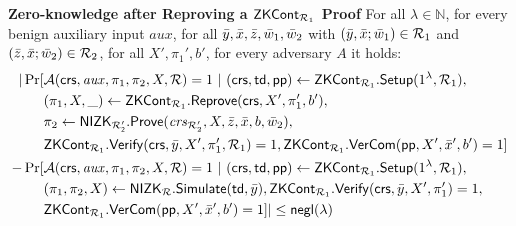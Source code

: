 \noindent \textbf{Zero-knowledge after Reproving a ${\mathsf{ZKCont}}_{\mathcal{R}_1}$ Proof} For all $\lambda \in \mathbb{N}$, for every benign auxiliary input $aux$, 
for all $\bar{y},\bar{x},\bar{z}, \bar{w}_1, \bar{w}_2$ with $(\bar{y}, \bar{x}; \bar{w}_1) \in \mathcal{R}_1$ and $(\bar{z}, \bar{x}; \bar{w}_2) \in \mathcal{R}_2$, for all $X',\pi_1', b'$, for every adversary $A$ it holds:
{\begin{align*}
		| \Pr[& \mathcal{A}(\mathsf{crs}, \mathit{aux}, \pi_1,\pi_2, X, \mathcal{R}) = 1 \ | \ (\mathsf{crs}, \mathsf{td}, \mathsf{pp}) \leftarrow {\ensuremath{\mathsf{ZKCont}}}_{\mathcal{R}_1}.{\mathsf{Setup}} (1^{\lambda}, \mathcal{R}_1), \\
		& (\pi_1, X, \_) \leftarrow {\ensuremath{\mathsf{ZKCont}}}_{\mathcal{R}_1}.{\mathsf{Reprove}} (\mathsf{crs}, X', \pi_1', b'), \\
		&\pi_2 \leftarrow {\ensuremath{\mathsf{NIZK_{\mathcal{R}'_2}}}}.{\mathsf{Prove}}(\mathit{crs}_{\mathcal{R}'_2}, X, \bar{z}, \bar{x}, b, \bar{w}_2), \\
		& {\mathsf{ZKCont}}_{\mathcal{R}_1}.{\mathsf{Verify}}(\mathsf{crs}, \bar{y}, X', \pi'_1, \mathcal{R}_1) = 1, {\mathsf{ZKCont}}_{\mathcal{R}_1}.{\mathsf{VerCom}}(\mathsf{pp}, X', \bar{x}', b') = 1]  \\
		- \Pr[& \mathcal{A}(\mathsf{crs}, \mathit{aux}, \pi_1,\pi_2, X, \mathcal{R}) = 1 \ | \ (\mathsf{crs}, \mathsf{td}, \mathsf{pp}) \leftarrow {\ensuremath{\mathsf{ZKCont}}}_{\mathcal{R}_1}.{\mathsf{Setup}} (1^{\lambda}, \mathcal{R}_1), \\ 
		& (\pi_1,\pi_2, X) \leftarrow {\ensuremath{\mathsf{NIZK_{\mathcal{R}}}}}.{\mathsf{Simulate}}(\mathsf{td}, \bar{y}), {\mathsf{ZKCont}}_{\mathcal{R}_1}.{\mathsf{Verify}}(\mathsf{crs}, \bar{y}, X', \pi'_1) = 1, \\
		& {\mathsf{ZKCont}}_{\mathcal{R}_1}.{\mathsf{VerCom}}(\mathsf{pp}, X', \bar{x}', b') = 1]| \leq \mathsf{negl}(\lambda)
\end{align*}}


